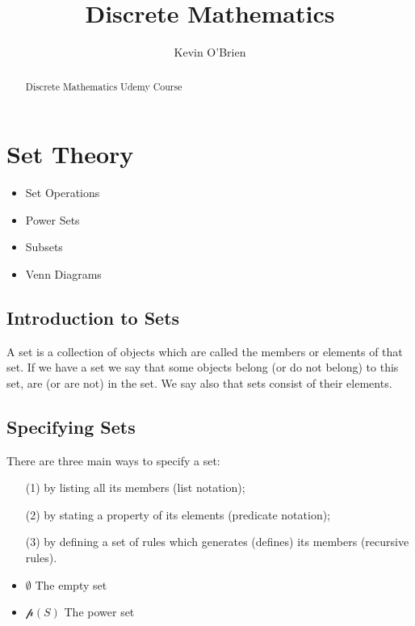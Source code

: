 \documentclass[12pt]{article}
\title{Discrete Mathematics}
\author{Kevin O'Brien}
\begin{document}
\maketitle

\begin{abstract}
Discrete Mathematics Udemy Course
\end{abstract}


\section{Set Theory}

\begin{itemize}
\item Set Operations
\item Power Sets
\item Subsets
\item Venn Diagrams
\end{itemize}

\subsection*{Introduction to Sets}
A set is a collection of objects which are called the members or elements of 
that set. If we have a set we say that some objects belong (or do not belong) to this set, are
(or are not) in the set. We say also that sets consist of their elements. 


\subsection*{Specifying Sets}

There are three main ways to specify a set: 

\begin{itemize}
\item[(1)] by listing all its members (list notation); 
\item[(2)] by stating a property of its elements (predicate notation); 
\item[(3)] by defining a set of rules which generates (defines) its members (recursive rules).
\end{itemize}

\begin{itemize}
\item $\emptyset$ The empty set
\item $\mathcal{p}(S)$ The power set
\end{itemize}
\end{document}
